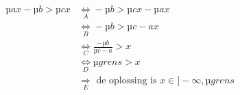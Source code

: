 \begin{align}
µ{a}x-µ{b}>µ{c}x & \underset{A}\Leftrightarrow -µ{b}>µ{c}x-µ{a}x\\
& \underset{B}\Leftrightarrow -µ{b}>µ{c-a}x \\ 
& \underset{C}\Leftrightarrow \frac{-µ{b}}{µ{c-a}}>x \\
& \underset{D}\Leftrightarrow µ{grens}>x\\
& \underset{E}\Rightarrow \text{ de oplossing is } x \in ]-\infty,µ{grens}
\end{align}
